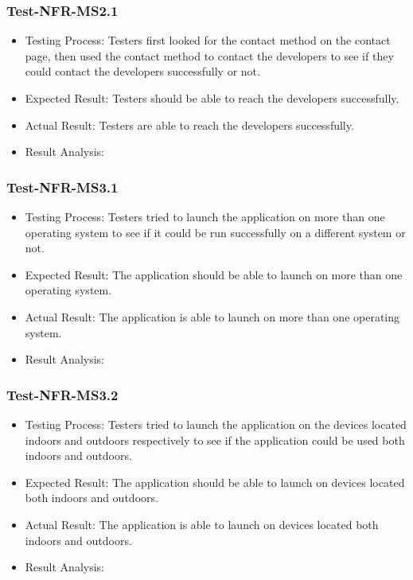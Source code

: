 \documentclass[12pt, titlepage]{article}
\begin{document}
\subsubsection{Test-NFR-MS2.1}
\begin{itemize}
    \item Testing Process: Testers first looked for the contact method on the contact page,
then used the contact method to contact the developers to see if they could contact the developers
successfully or not.
    \item Expected Result: Testers should be able to reach the developers successfully.
    \item Actual Result: Testers are able to reach the developers successfully.
    \item Result Analysis: \pass
\end{itemize}


\subsubsection{Test-NFR-MS3.1}
\begin{itemize}
    \item Testing Process:  Testers tried to launch the application on more than one operating
system to see if it could be run successfully on a different system or not.
    \item Expected Result: The application should be able to launch on more than one operating system. 
    \item Actual Result: The application is able to launch on more than one operating system. 
    \item Result Analysis: \pass
\end{itemize}


\subsubsection{Test-NFR-MS3.2}
\begin{itemize}
    \item Testing Process: Testers tried to launch the application on the devices located indoors and outdoors respectively to see if the application could be used both indoors and
outdoors.
    \item Expected Result: The application should be able to launch on devices located both indoors and outdoors.
    \item Actual Result: The application is able to launch on devices located both indoors and outdoors.
    \item Result Analysis: \pass
\end{itemize}
\end{document}
